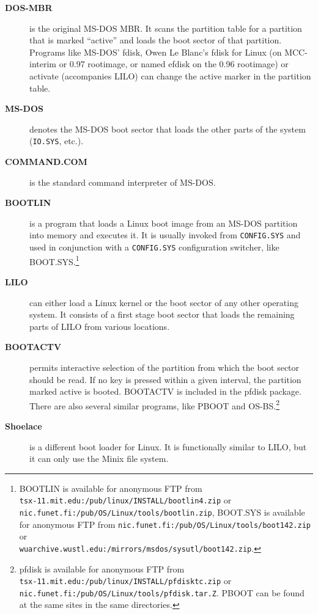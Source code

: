 \begin{description}
  \item[\bf DOS-MBR] is the original MS-DOS MBR. It scans the partition
    table for a partition that is marked ``active'' and loads the boot
    sector of that partition. Programs like MS-DOS' fdisk, Owen Le Blanc's
    fdisk for Linux (on MCC-interim or 0.97 rootimage, or named efdisk on
    the 0.96 rootimage) or activate (accompanies LILO)
    can change the active marker in the partition table.
  \item[\bf MS-DOS] denotes the MS-DOS boot sector that loads the other parts
    of the system ({\tt IO.SYS}, etc.).
  \item[\bf COMMAND.COM] is the standard command interpreter of MS-DOS.
  \item[\bf BOOTLIN] is a program that loads a Linux boot image from an
    MS-DOS partition into memory and executes it. It is usually invoked
    from {\tt CONFIG.SYS} and used in conjunction with a {\tt CONFIG.SYS}
    configuration switcher, like BOOT.SYS.\footnote{BOOTLIN is
      available for anonymous FTP from \\
      {\tt tsx-11.mit.edu:/pub/linux/INSTALL/bootlin4.zip} or \\
      {\tt nic.funet.fi:/pub/OS/Linux/tools/bootlin.zip}, BOOT.SYS is
      available for anonymous FTP from
      {\tt nic.funet.fi:/pub/OS/Linux/tools/boot142.zip} or \\
      {\tt wuarchive.wustl.edu:/mirrors/msdos/sysutl/boot142.zip}.}
  \item[\bf LILO] can either load a Linux kernel or the boot sector of any
    other operating system. It consists of a first stage boot sector that
    loads the remaining parts of LILO from various locations.
  \item[\bf BOOTACTV] permits interactive selection of the partition from
    which the boot sector should be read. If no key is pressed within a
    given interval, the partition marked active is booted. BOOTACTV is
    included in the pfdisk package. There are also several similar
    programs, like PBOOT and OS-BS.\footnote{pfdisk is available for
      anonymous FTP from \\
      {\tt tsx-11.mit.edu:/pub/linux/INSTALL/pfdisktc.zip} or \\
      {\tt nic.funet.fi:/pub/OS/Linux/tools/pfdisk.tar.Z}. PBOOT can be
      found at the same sites in the same directories.}
  \item[\bf Shoelace] is a different boot loader for Linux. It is
    functionally similar to LILO, but it can only use the Minix file system.
\end{description}


